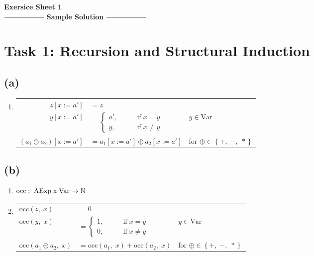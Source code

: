 \documentclass[12pt]{scrartcl}
\begin{document}
\begin{center}
	\huge\textbf{Exersice Sheet 1}\\[0.5cm]
	
	\Large
	$\mathrel{\vcenter{\hbox{\rule{2cm}{0.5pt}}}}$ \textbf{Sample 				Solution} $\mathrel{\vcenter{\hbox{\rule{2cm}{0.5pt}}}}$\\[1cm]
\end{center}
	\large

	\section*{Task 1: Recursion and Structural Induction}
	
	\subsection*{(a)}
	
	\begin{enumerate}
		\item[] \begin{tabular}{rll}
					$z\left[x:=a'\right]$ & $=z$ &\\
					$y\left[x:=a'\right]$ & $=\left\{\begin{aligned}a', &\qquad \text{if}\; x=y\\ y, &\qquad \text{if}\; x\neq y\end{aligned}\right.$ & $y\in \text{Var}$\\
					$\left(a_{1}\oplus a_{2}\right)\left[x:=a'\right]$ & $=a_{1}\left[x:=a'\right]\oplus a_{2}\left[x:=a'\right]$ & for $\oplus \in \left\{+,\; -,\; *\right\}$\\
				\end{tabular}
	\end{enumerate}
	
	\subsection*{(b)}
	
	\begin{enumerate}
		\item[] $\text{occ}:\; \text{AExp\;x\;Var} \rightarrow \mathbb{N}$
		\item[] \begin{tabular}{lll}
					$\text{occ}\left(z,\; x\right)$ & $=0$ &\\
					$\text{occ}\left(y,\; x\right)$ & $=\left\{\begin{aligned}1, &\qquad \text{if}\; x=y\\ 0, &\qquad \text{if}\; x\neq y\end{aligned}\right.$ & $y\in \text{Var}$\\
					$\text{occ}\left(a_{1}\oplus a_{2},\; x\right)$ & $=\text{occ}\left(a_{1},\; x\right) + \text{occ}\left(a_{2},\; x\right)$ & for $\oplus \in \left\{+,\; -,\; *\right\}$\\
				\end{tabular}
	\end{enumerate}
	
\end{document}

